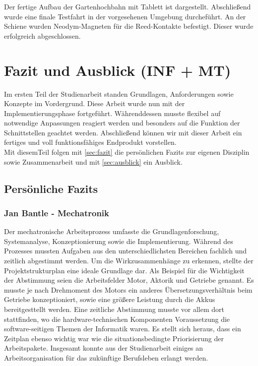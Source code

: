 Der fertige Aufbau der Gartenhochbahn mit Tablett ist %
dargestellt. Abschließend wurde eine finale Testfahrt in der vorgesehenen Umgebung durcheführt. An der Schiene wurden Neodym-Magneten für die Reed-Kontakte befestigt. Dieser wurde erfolgreich abgeschlossen.




\chapter{Fazit und Ausblick (INF + MT)}
Im ersten Teil der Studienarbeit standen Grundlagen, Anforderungen sowie Konzepte im Vordergrund. Diese Arbeit wurde nun mit der Implementierungsphase fortgeführt. Währenddessen musste flexibel auf notwendige Anpassungen reagiert werden und besonders auf die Funktion der Schnittstellen geachtet werden. Abschließend können  wir mit dieser Arbeit ein fertiges und voll funktionsfähiges Endprodukt vorstellen. \\

Mit diesemTeil folgen mit \autoref{sec:fazit} die persönlichen Fazits zur eigenen Disziplin sowie Zusammenarbeit und mit \autoref{sec:ausblick} ein Ausblick. 


\section{Persönliche Fazits}
\label{sec:fazit}

\subsection{Jan Bantle - Mechatronik}

Der mechatronische Arbeitsprozess umfasste die Grundlagenforschung, Systemanalyse, Konzeptionierung sowie die Implementierung. Während des Prozesses mussten Aufgaben aus den unterschiedlichsten Bereichen fachlich und zeitlich abgestimmt werden. Um die Wirkzusammenhänge zu erkennen, stellte  der Projektstrukturplan eine ideale Grundlage dar. Als Beispiel für die Wichtigkeit der Abstimmung seien die Arbeitsfelder Motor, Aktorik und Getriebe genannt. Es musste je nach Drehmoment des Motors  ein anderes Übersetzungsverhältnis beim Getriebe konzeptioniert, sowie eine größere Leistung durch die Akkus bereitgesttellt werden. Eine zeitliche Abstimmung musste vor allem dort stattfinden, wo die hardware-technischen Komponenten Voraussetzung die software-seitigen Themen der Informatik waren. Es stellt sich heraus, dass ein Zeitplan ebenso wichtig war wie die situationsbedingte Priorisierung der Arbeitspakete. Insgesamt konnte aus der Studienarbeit einiges an Arbeitsorganisation für das zukünftige Berufsleben erlangt werden. \\


